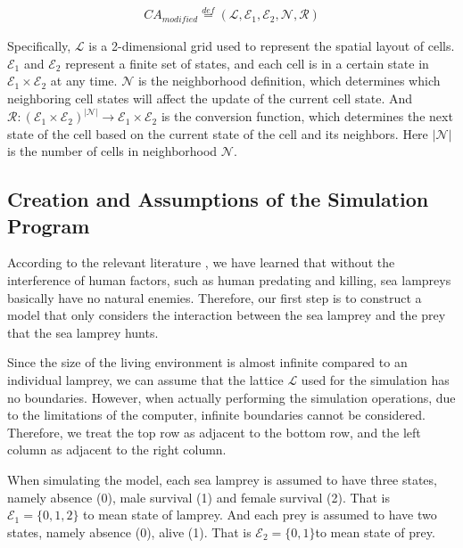 \documentclass{mcmthesis}
\begin{document}
\begin{align}
CA_{modified} \overset{def}{=} ({\displaystyle {\mathcal {L}}}, {\displaystyle {\mathcal {E}}}_1, {\displaystyle {\mathcal {E}}}_2, {\displaystyle {\mathcal {N}}}, {\displaystyle {\mathcal {R}}})
\end{align}

Specifically, ${\displaystyle {\mathcal {L}}}$ is a 2-dimensional grid used to represent the spatial layout of cells. ${\displaystyle {\mathcal {E}}}_1$ and ${\displaystyle {\mathcal {E}}}_2$  represent a finite set of states, and each cell is in a certain state in ${\displaystyle {\mathcal {E}}}_1 \times {\displaystyle {\mathcal {E}}}_2 $ at any time. ${\displaystyle {\mathcal {N}}}$ is the neighborhood definition, which determines which neighboring cell states will affect the update of the current cell state. And ${\displaystyle {\mathcal {R}}}: ({\displaystyle {\mathcal {E}}}_1 \times {\displaystyle {\mathcal {E}}}_2 )^{\left|{\displaystyle {\mathcal {N}}}\right|} \rightarrow {\displaystyle {\mathcal {E}}}_1 \times {\displaystyle {\mathcal {E}}}_2 $ is the conversion function, which determines the next state of the cell based on the current state of the cell and its neighbors. Here $\left|{\displaystyle {\mathcal {N}}}\right|$ is the number of cells in neighborhood ${\displaystyle {\mathcal {N}}}$.


\subsection{Creation and Assumptions of the Simulation Program}

According to the relevant literature \cite{6}, we have learned that without the interference of human factors, such as human predating and killing, sea lampreys basically have no natural enemies. Therefore, our first step is to construct a model that only considers the interaction between the sea lamprey and the prey that the sea lamprey hunts.

Since the size of the living environment is almost infinite compared to an individual lamprey, we can assume that the lattice ${\displaystyle {\mathcal {L}}}$ used for the simulation has no boundaries. However, when actually performing the simulation operations, due to the limitations of the computer, infinite boundaries cannot be considered. Therefore, we treat the top row as adjacent to the bottom row, and the left column as adjacent to the right column.

When simulating the model, each sea lamprey is assumed to have three states, namely absence (0), male survival (1) and female survival (2). That is ${\displaystyle {\mathcal {E}}}_1 = \{0, 1, 2\}$ to mean state of lamprey. And each prey is assumed to have two states, namely absence (0), alive (1). That is ${\displaystyle {\mathcal {E}}}_2 = \{0, 1\}$to mean state of prey.
\end{document}
